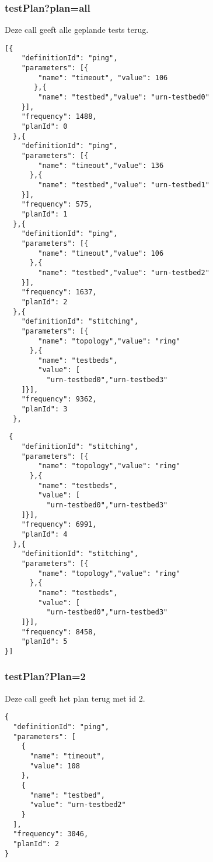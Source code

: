 \documentclass[11pt]{article}
\begin{document}
\subsubsection{testPlan?plan=all}
Deze call geeft alle geplande tests terug.
\begin{verbatim}
[{
    "definitionId": "ping",
    "parameters": [{
        "name": "timeout", "value": 106
       },{
        "name": "testbed","value": "urn-testbed0"
    }],
    "frequency": 1488,
    "planId": 0
  },{
    "definitionId": "ping",
    "parameters": [{
        "name": "timeout","value": 136
      },{
        "name": "testbed","value": "urn-testbed1"
    }],
    "frequency": 575,
    "planId": 1
  },{
    "definitionId": "ping",
    "parameters": [{
        "name": "timeout","value": 106
      },{
        "name": "testbed","value": "urn-testbed2"
    }],
    "frequency": 1637,
    "planId": 2
  },{
    "definitionId": "stitching",
    "parameters": [{
        "name": "topology","value": "ring"
      },{
        "name": "testbeds",
        "value": [
          "urn-testbed0","urn-testbed3"
    ]}],
    "frequency": 9362,
    "planId": 3
  },
 \end{verbatim}
 \clearpage
 \begin{verbatim}
 {
    "definitionId": "stitching",
    "parameters": [{
        "name": "topology","value": "ring"
      },{
        "name": "testbeds",
        "value": [
          "urn-testbed0","urn-testbed3"
    ]}],
    "frequency": 6991,
    "planId": 4
  },{
    "definitionId": "stitching",
    "parameters": [{
        "name": "topology","value": "ring"
      },{
        "name": "testbeds",
        "value": [
          "urn-testbed0","urn-testbed3"
    ]}],
    "frequency": 8458,
    "planId": 5
}]
\end{verbatim}

\subsubsection{testPlan?Plan=2}
Deze call geeft het plan terug met id 2.
\begin{verbatim}
{
  "definitionId": "ping",
  "parameters": [
    {
      "name": "timeout",
      "value": 108
    },
    {
      "name": "testbed",
      "value": "urn-testbed2"
    }
  ],
  "frequency": 3046,
  "planId": 2
}
\end{verbatim}

\clearpage
\end{document}
